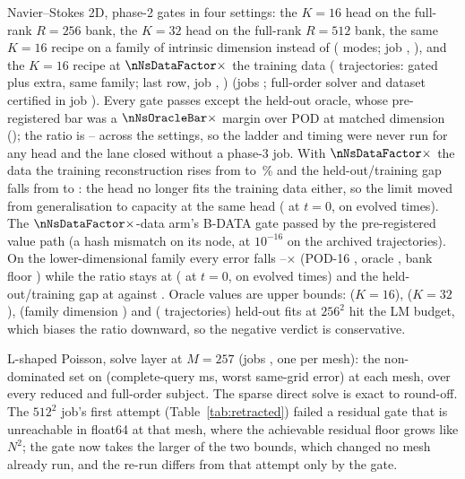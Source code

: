 \begin{table}[h]
\centering
\caption{Navier--Stokes 2D, phase-2 gates in four settings: the $K=16$
head on the full-rank $R=256$ bank, the $K=32$ head on the full-rank
$R=512$ bank, the same $K=16$ recipe on a family of intrinsic dimension
\nNsFamDimLow{} instead of \nNsFamDimBase{} (\nNsFamLowModes{} modes; job
\provNsFamJob, \provNsFamGpu), and the $K=16$ recipe at
$\nNsDataFactor\times$ the training data (\nNsDataTrainN{} trajectories:
\nNsDataTrainBase{} gated plus \nNsDataTrainExtra{} extra, same family;
last row, job \provNsDataJob, \provNsDataGpu) (jobs \provNsJobs; full-order
solver and dataset certified in job \provNsFomJob). Every gate passes
except the held-out oracle, whose pre-registered bar was a
$\nNsOracleBar\times$ margin over POD at matched dimension
(\provNsBarSource); the ratio is \nNsCellRatioMin--\nNsCellRatioMax{} across
the \nNsCellArms{} settings, so the ladder and timing were never run for
any head and the lane closed without a phase-3 job. With
$\nNsDataFactor\times$ the data the training reconstruction rises from
\nNsDataBaseTrainRecon{} to \nNsDataTrainRecon\,\% and the
held-out/training gap falls from \nNsDataBaseGap{} to
\nNsDataHeldoutOverTrain: the head no longer fits the training data either,
so the limit moved from generalisation to capacity at the same head
(\nNsDataPodOverOracleTzero{} at $t=0$, \nNsDataPodOverOracleEvolved{} on
evolved times). The $\nNsDataFactor\times$-data arm's B-DATA gate passed
by the pre-registered value path (a hash mismatch on its node, at
$10^{-16}$ on the archived trajectories). On the lower-dimensional
family every error falls \nNsFamDropMin--\nNsFamDropMax$\times$ (POD-16
\nNsFamDropPod, oracle \nNsFamDropOracle, bank floor \nNsFamDropFloor)
while the ratio stays at \nNsFamOracleRatio{} (\nNsFamPodOverOracleTzero{}
at $t=0$, \nNsFamPodOverOracleEvolved{} on evolved times) and the
held-out/training gap at \nNsFamHeldoutOverTrain{} against
\nNsFamBaseGap. Oracle values are upper bounds:
\nNsBudgetExitsKsixteen{} ($K{=}16$), \nNsBudgetExitsKthirtyTwo{}
($K{=}32$), \nNsFamBudgetExits{} (family dimension \nNsFamDimLow) and
\nNsDataBudgetExits{} (\nNsDataTrainN{} trajectories) held-out fits at
$256^2$ hit the LM budget, which biases the ratio downward, so the
negative verdict is conservative.}
\label{tab:ns}
\resizebox{\linewidth}{!}{}
\end{table}

\begin{table}[h]
\centering
\caption{L-shaped Poisson, solve layer at $M=257$ (jobs
\provLshapeSolveJobs, one per mesh): the non-dominated set on (complete-query
ms, worst same-grid error) at each mesh, over every reduced and full-order
subject. The sparse direct solve is exact to round-off. The $512^2$ job's
first attempt (Table~\ref{tab:retracted}) failed a residual gate that is
unreachable in float64 at that mesh, where the achievable residual floor grows
like $N^2$; the gate now takes the larger of the two bounds, which changed no
mesh already run, and the re-run differs from that attempt only by the gate.}
\label{tab:lshape-solve}

\end{table}


